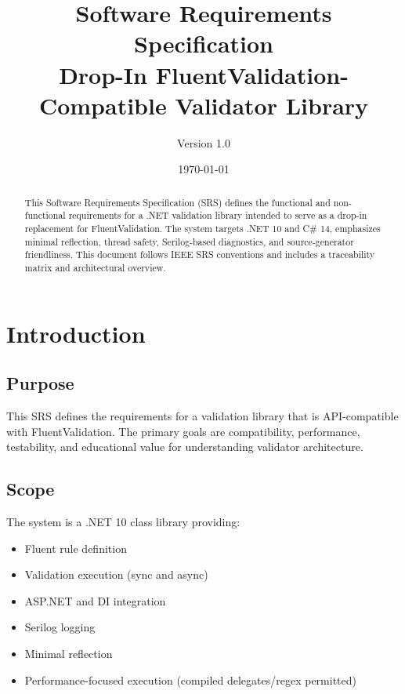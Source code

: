 \documentclass[12pt,technote]{IEEEtran}
\title{Software Requirements Specification\\
Drop-In FluentValidation-Compatible Validator Library}
\author{Version 1.0}
\date{\today}
\begin{document}
\maketitle

\begin{abstract}
This Software Requirements Specification (SRS) defines the functional and non-functional requirements for a .NET validation library intended to serve as a drop-in replacement for FluentValidation. The system targets .NET 10 and C\# 14, emphasizes minimal reflection, thread safety, Serilog-based diagnostics, and source-generator friendliness. This document follows IEEE SRS conventions and includes a traceability matrix and architectural overview.
\end{abstract}

\tableofcontents
\newpage

\section{Introduction}

\subsection{Purpose}
This SRS defines the requirements for a validation library that is API-compatible with FluentValidation. The primary goals are compatibility, performance, testability, and educational value for understanding validator architecture.

\subsection{Scope}
The system is a .NET 10 class library providing:
\begin{itemize}[noitemsep]
    \item Fluent rule definition
    \item Validation execution (sync and async)
    \item ASP.NET and DI integration
    \item Serilog logging
    \item Minimal reflection
    \item Performance-focused execution (compiled delegates/regex permitted)
\end{itemize}
\end{document}
